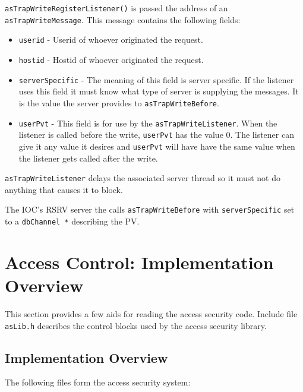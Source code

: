 \verb|asTrapWriteRegisterListener()| is passed the address of an \verb|asTrapWriteMessage|. This message contains 
the following fields:

\begin{itemize}
\item  \verb|userid| - Userid of whoever originated the request.

\item  \verb|hostid| - Hostid of whoever originated the request.

\item \verb|serverSpecific| - The meaning of this field is server specific.
If the listener uses this field it must know what type of server is supplying the messages.
It is the value the server provides to \verb|asTrapWriteBefore|.

\item \verb|userPvt| - This field is for use by the \verb|asTrapWriteListener|.
When the listener is called before the write, \verb|userPvt| has the value 0.
The listener can give it any value it desires and \verb|userPvt| will have have the same value when the listener gets called after the write.
\end{itemize}

\verb|asTrapWriteListener| delays the associated server thread so it must not do anything that causes it to block.

The IOC's RSRV server the calls \verb|asTrapWriteBefore| with \verb|serverSpecific| set to a \verb|dbChannel *| describing the PV.

\section{Access Control: Implementation Overview}

This section provides a few aids for reading the access security code.
Include file \verb|asLib.h| describes the control blocks used by the access security library.

\subsection{Implementation Overview}

The following files form the access security system:


